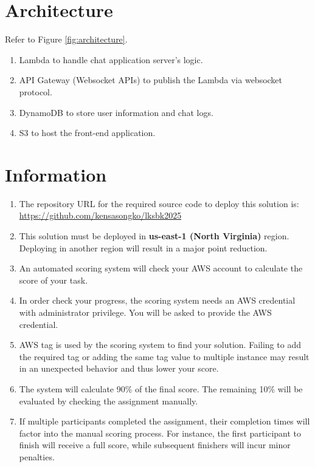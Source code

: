 \documentclass{article}
\begin{document}
\section{Architecture}\label{architecture}

Refer to Figure \ref{fig:architecture}.
\begin{enumerate}
    \item Lambda to handle chat application server's logic.
    \item API Gateway (Websocket APIs) to publish the Lambda via websocket protocol.
    \item DynamoDB to store user information and chat logs.
    \item S3 to host the front-end application.
\end{enumerate}

\section{Information}\label{information}

\begin{enumerate}
  \item The repository URL for the required source code to deploy this solution is:\\
  \href{https://github.com/kensasongko/lksbk2025}{https://github.com/kensasongko/lksbk2025}
  \item This solution must be deployed in \textbf{us-east-1 (North Virginia)} region. Deploying in another region will result in a major point reduction.
  \item An automated scoring system will check your AWS account to calculate the score of your task.
  \item In order check your progress, the scoring system needs an AWS credential with administrator privilege. You will be asked to provide the AWS credential.
  \item AWS tag is used by the scoring system to find your solution. Failing to add the required tag or adding the same tag value to multiple instance may result in an unexpected behavior and thus lower your score.
  \item The system will calculate 90\% of the final score. The remaining 10\% will be evaluated by checking the assignment manually.
  \item If multiple participants completed the assignment, their completion times will factor into the manual scoring process. For instance, the first participant to finish will receive a full score, while subsequent finishers will incur minor penalties.
\end{enumerate}
\end{document}
